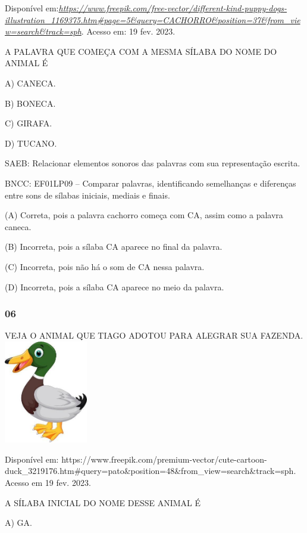 Disponível
em:\href{https://www.freepik.com/free-vector/different-kind-puppy-dogs-illustration_1169375.htm\#page=5\&query=CACHORRO\&position=37\&from_view=search\&track=sph}{\emph{https://www.freepik.com/free-vector/different-kind-puppy-dogs-illustration\_1169375.htm\#page=5\&query=CACHORRO\&position=37\&from\_view=search\&track=sph}}.
Acesso em: 19 fev. 2023.

A PALAVRA QUE COMEÇA COM A MESMA SÍLABA DO NOME DO ANIMAL É

A) CANECA.

B) BONECA.

C) GIRAFA.

D) TUCANO.

SAEB: Relacionar elementos sonoros das palavras com sua
representação escrita.

BNCC: EF01LP09 -- Comparar palavras, identificando semelhanças e
diferenças entre sons de sílabas iniciais, mediais e finais.

(A) Correta, pois a palavra cachorro começa com CA, assim como a palavra
caneca.

(B) Incorreta, pois a sílaba CA aparece no final da palavra.

(C) Incorreta, pois não há o som de CA nessa palavra.

(D) Incorreta, pois a sílaba CA aparece no meio da palavra.

\subsubsection{06}\label{section-46}

VEJA O ANIMAL QUE TIAGO ADOTOU PARA ALEGRAR SUA
FAZENDA.\includegraphics[width=1.43478in,height=1.76408in]{media/image215.jpg}

Disponível em: 
https://www.freepik.com/premium-vector/cute-cartoon-duck\_3219176.htm\#query=pato\&position=48\&from\_view=search\&track=sph.
Acesso em 19 fev. 2023.

A SÍLABA INICIAL DO NOME DESSE ANIMAL É

A) GA.

